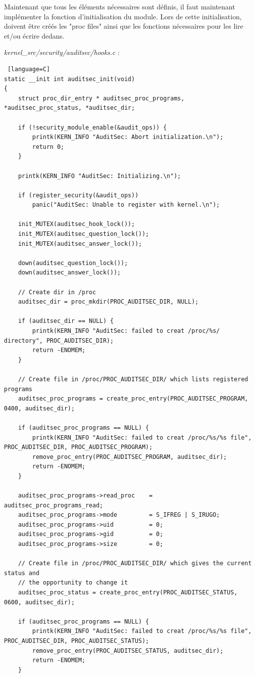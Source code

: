 \documentclass[pdftex,a4paper,titlepage,11pt]{article}
\begin{document}
Maintenant que tous les éléments nécessaires sont définis, il faut maintenant implémenter la fonction d'initialisation du module. Lors de cette initialisation, doivent être créés les "proc files" ainsi que les fonctions nécessaires pour les lire et/ou écrire dedans.

\textit{{kernel\_src}/security/auditsec/hooks.c} :
\begin{lstlisting} [language=C]
static __init int auditsec_init(void)
{
	struct proc_dir_entry * auditsec_proc_programs, *auditsec_proc_status, *auditsec_dir;

	if (!security_module_enable(&audit_ops)) {
		printk(KERN_INFO "AuditSec: Abort initialization.\n");
		return 0;
	}

	printk(KERN_INFO "AuditSec: Initializing.\n");

	if (register_security(&audit_ops))
		panic("AuditSec: Unable to register with kernel.\n");

	init_MUTEX(auditsec_hook_lock());
	init_MUTEX(auditsec_question_lock());
	init_MUTEX(auditsec_answer_lock());

	down(auditsec_question_lock());
	down(auditsec_answer_lock());

	// Create dir in /proc
	auditsec_dir = proc_mkdir(PROC_AUDITSEC_DIR, NULL);

	if (auditsec_dir == NULL) {
		printk(KERN_INFO "AuditSec: failed to creat /proc/%s/ directory", PROC_AUDITSEC_DIR);
		return -ENOMEM;
	}

	// Create file in /proc/PROC_AUDITSEC_DIR/ which lists registered programs
	auditsec_proc_programs = create_proc_entry(PROC_AUDITSEC_PROGRAM, 0400, auditsec_dir);

	if (auditsec_proc_programs == NULL) {
		printk(KERN_INFO "AuditSec: failed to creat /proc/%s/%s file", PROC_AUDITSEC_DIR, PROC_AUDITSEC_PROGRAM);
		remove_proc_entry(PROC_AUDITSEC_PROGRAM, auditsec_dir);
		return -ENOMEM;
	}

	auditsec_proc_programs->read_proc    = auditsec_proc_programs_read;
	auditsec_proc_programs->mode         = S_IFREG | S_IRUGO;
	auditsec_proc_programs->uid          = 0;
	auditsec_proc_programs->gid          = 0;
	auditsec_proc_programs->size         = 0;

	// Create file in /proc/PROC_AUDITSEC_DIR/ which gives the current status and
	// the opportunity to change it
	auditsec_proc_status = create_proc_entry(PROC_AUDITSEC_STATUS, 0600, auditsec_dir);

	if (auditsec_proc_programs == NULL) {
		printk(KERN_INFO "AuditSec: failed to creat /proc/%s/%s file", PROC_AUDITSEC_DIR, PROC_AUDITSEC_STATUS);
		remove_proc_entry(PROC_AUDITSEC_STATUS, auditsec_dir);
		return -ENOMEM;
	}


\end{lstlisting}
\end{document}
